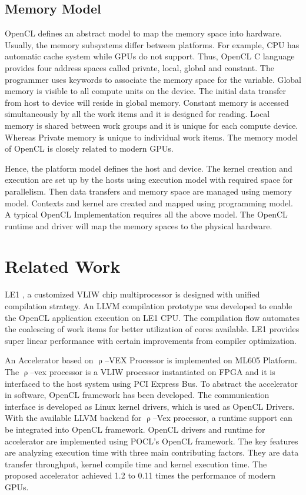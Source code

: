 \subsection{Memory Model}
OpenCL defines an abstract model to map the memory space into hardware. Usually, the memory subsystems differ between platforms. For example, CPU has automatic cache system while GPUs do not support. Thus, OpenCL C language provides four address spaces called private, local, global and constant. The programmer uses keywords to associate the memory space for the variable. Global memory is visible to all compute units on the device. The initial data transfer from host to device will reside in global memory. Constant memory is accessed simultaneously by all the work items and it is designed for reading. Local memory is shared between work groups and it is unique for each compute device. Whereas Private memory is unique to individual work items. The memory model of OpenCL is closely related to modern GPUs.

Hence, the platform model defines the host and device. The kernel creation and execution are set up by the hosts using execution model with required space for parallelism. Then data transfers and memory space are managed using memory model. Contexts and kernel are created and mapped using programming model. A typical OpenCL Implementation requires all the above model. The OpenCL runtime and driver will map the memory spaces to the physical hardware.

\section{Related Work}
LE1 \cite{13}, a customized VLIW chip multiprocessor is designed with unified compilation strategy. An LLVM compilation prototype was developed to enable the OpenCL application execution on LE1 CPU. The compilation flow automates the coalescing of work items for better utilization of cores available. LE1 provides super linear performance with certain improvements from compiler optimization.

An Accelerator based on $\uprho$--VEX Processor \cite{14} is implemented on ML605 Platform. The $\uprho$--vex processor is a VLIW processor instantiated on FPGA and it is interfaced to the host system using PCI Express Bus. To abstract the accelerator in software, OpenCL framework has been developed. The communication interface is developed as Linux kernel drivers, which is used as OpenCL Drivers. With the available LLVM backend for $\uprho$--Vex processor, a runtime support can be integrated into OpenCL framework. OpenCL drivers and runtime for accelerator are implemented using POCL's OpenCL framework. The key features are analyzing execution time with three main contributing factors. They are data transfer throughput, kernel compile time and kernel execution time. The proposed accelerator achieved 1.2 to 0.11 times the performance of modern GPUs.

